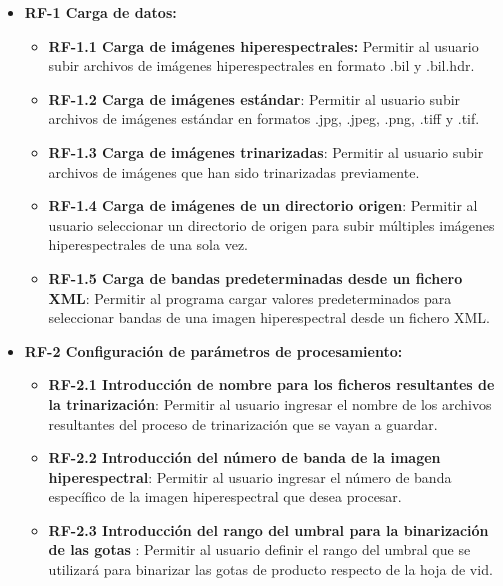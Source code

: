 \begin{itemize}

	\item \textbf{RF-1 Carga de datos:}
		\begin{itemize}
  			\item \textbf{RF-1.1 Carga de imágenes hiperespectrales:} Permitir al usuario subir archivos de imágenes hiperespectrales en formato .bil y .bil.hdr.
                \item \textbf{RF-1.2 Carga de imágenes estándar}: Permitir al usuario subir archivos de imágenes estándar en formatos .jpg, .jpeg, .png, .tiff y .tif.
			\item \textbf{RF-1.3 Carga de imágenes trinarizadas}: Permitir al usuario subir archivos de imágenes que han sido trinarizadas previamente.
   			\item \textbf{RF-1.4 Carga de imágenes de un directorio origen}: Permitir al usuario seleccionar un directorio de origen para subir múltiples imágenes hiperespectrales de una sola vez.
         	\item \textbf{RF-1.5 Carga de bandas predeterminadas desde un fichero XML}: Permitir al programa cargar valores predeterminados para seleccionar bandas de una imagen hiperespectral desde un fichero XML.
		\end{itemize}
  
	\item \textbf{RF-2 Configuración de parámetros de procesamiento:}
    	\begin{itemize}
    		\item \textbf{RF-2.1 Introducción de nombre para los ficheros resultantes de la trinarización}: Permitir al usuario ingresar el nombre de los archivos resultantes del proceso de trinarización que se vayan a guardar.
          	\item \textbf{RF-2.2 Introducción del número de banda de la imagen hiperespectral}:  Permitir al usuario ingresar el número de banda específico de la imagen hiperespectral que desea procesar.
                \item \textbf{RF-2.3 Introducción del rango del umbral para la binarización de las gotas }: Permitir al usuario definir el rango del umbral que se utilizará para binarizar las gotas de producto respecto de la hoja de vid.
    	\end{itemize}
     

\end{itemize}

